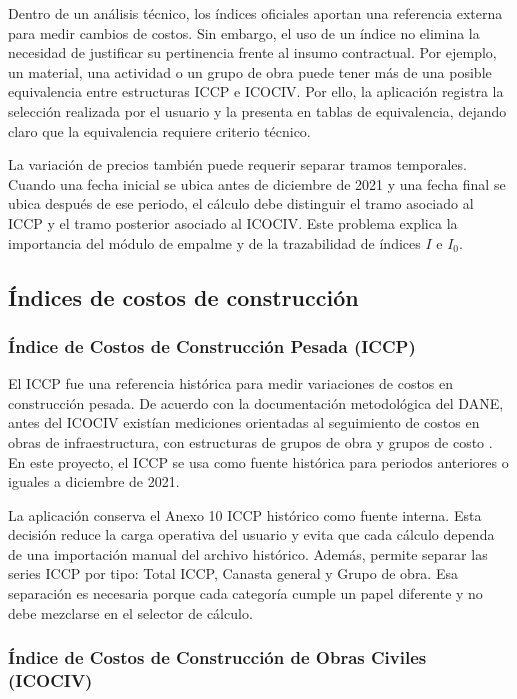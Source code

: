 \documentclass[12pt,letterpaper]{article}
\providecommand{\parencite}{\citep}
\newcommand{\ICOCIV}{ICOCIV}
\newcommand{\ICCP}{ICCP}
\newcommand{\DANE}{DANE}
\begin{document}
Dentro de un análisis técnico, los índices oficiales aportan una referencia externa para medir cambios de costos. Sin embargo, el uso de un índice no elimina la necesidad de justificar su pertinencia frente al insumo contractual. Por ejemplo, un material, una actividad o un grupo de obra puede tener más de una posible equivalencia entre estructuras \ICCP{} e \ICOCIV. Por ello, la aplicación registra la selección realizada por el usuario y la presenta en tablas de equivalencia, dejando claro que la equivalencia requiere criterio técnico.

La variación de precios también puede requerir separar tramos temporales. Cuando una fecha inicial se ubica antes de diciembre de 2021 y una fecha final se ubica después de ese periodo, el cálculo debe distinguir el tramo asociado al \ICCP{} y el tramo posterior asociado al \ICOCIV. Este problema explica la importancia del módulo de empalme y de la trazabilidad de índices \(I\) e \(I_0\).

\subsection{Índices de costos de construcción}

\subsubsection{Índice de Costos de Construcción Pesada (ICCP)}

El \ICCP{} fue una referencia histórica para medir variaciones de costos en construcción pesada. De acuerdo con la documentación metodológica del \DANE, antes del \ICOCIV{} existían mediciones orientadas al seguimiento de costos en obras de infraestructura, con estructuras de grupos de obra y grupos de costo \parencite{dane_ficha_icociv,dane_metodologia_icociv}. En este proyecto, el \ICCP{} se usa como fuente histórica para periodos anteriores o iguales a diciembre de 2021.

La aplicación conserva el Anexo 10 \ICCP{} histórico como fuente interna. Esta decisión reduce la carga operativa del usuario y evita que cada cálculo dependa de una importación manual del archivo histórico. Además, permite separar las series \ICCP{} por tipo: Total \ICCP, Canasta general y Grupo de obra. Esa separación es necesaria porque cada categoría cumple un papel diferente y no debe mezclarse en el selector de cálculo.

\subsubsection{Índice de Costos de Construcción de Obras Civiles (ICOCIV)}
\end{document}
